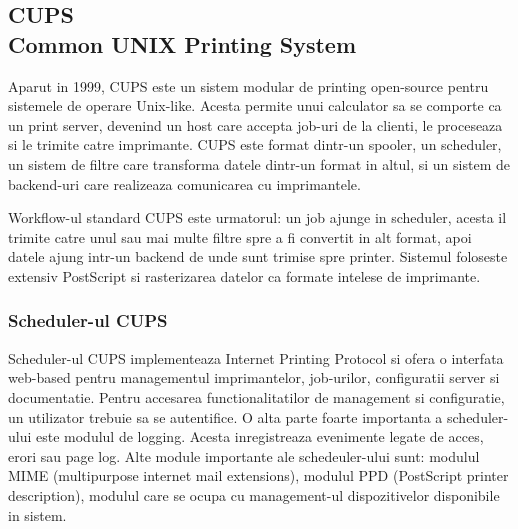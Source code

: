 \documentclass[12pt]{report}
\begin{document}
		\subsection[CUPS]{CUPS\\ {\normalsize Common UNIX Printing System}}
Aparut in 1999, CUPS este un sistem modular de printing open-source pentru sistemele de operare Unix-like. Acesta permite unui calculator sa se comporte ca un print server, devenind un host care accepta job-uri de la clienti, le proceseaza si le trimite catre imprimante.
CUPS este format dintr-un spooler, un scheduler, un sistem de filtre care transforma datele dintr-un format in altul, si un sistem de backend-uri care realizeaza comunicarea cu imprimantele.

Workflow-ul standard CUPS este urmatorul: un job ajunge in scheduler, acesta il trimite catre unul sau mai multe filtre spre a fi convertit in alt format, apoi datele ajung intr-un backend de unde sunt trimise spre printer. Sistemul foloseste extensiv PostScript si rasterizarea datelor ca formate intelese de imprimante.
			\subsubsection{Scheduler-ul CUPS}
Scheduler-ul CUPS implementeaza Internet Printing Protocol si ofera o interfata web-based pentru managementul imprimantelor, job-urilor, configuratii server si documentatie. Pentru accesarea functionalitatilor de management si configuratie, un utilizator trebuie sa se autentifice. 
O alta parte foarte importanta a scheduler-ului este modulul de logging. Acesta inregistreaza evenimente legate de acces, erori sau page log.
Alte module importante ale schedeuler-ului sunt: modulul MIME (multipurpose internet mail extensions), modulul PPD (PostScript printer description), modulul care se ocupa cu management-ul dispozitivelor disponibile in sistem.
\end{document}
